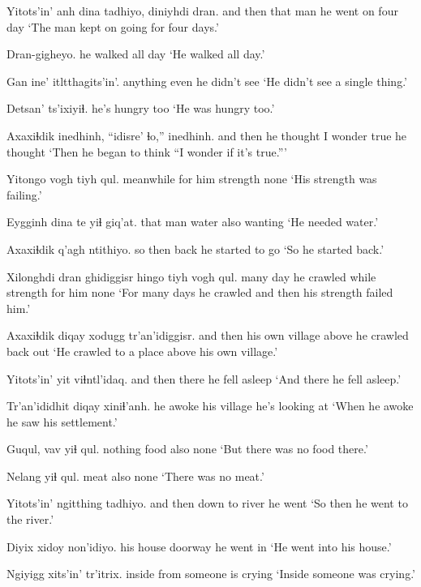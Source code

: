\documentclass[12pt]{article}
\begin{document}
\gll Yitots'in' anh dina tadhiyo, diniyhdi dran.
{and then} that man {he went on} four day
\glt `The man kept on going for four days.'
\glend

\gll Dran-gigheyo.
{{he walked all day}}
\glt `He walked all day.'
\glend

\gll Gan ine' itltthagits'in'.
anything even {he didn't see}
\glt `He didn't see a single thing.'
\glend

\gll Detsan' ts'ixiyiɬ.
{he's hungry} too
\glt `He was hungry too.'
\glend

\gll Axaxiɬdik inedhinh, ``idisre' ɬo,'' inedhinh.
{and then} {he thought} {I wonder} true {he thought}
\glt `Then he began to think ``I wonder if it's true.'''
\glend

\gll Yitongo vogh tiyh qul.
meanwhile {for him} strength none
\glt `His strength was failing.'
\glend

\gll Eygginh dina te yiɬ giq'at.
that  man water also wanting
\glt `He needed water.'
\glend

\gll Axaxiɬdik q'agh ntithiyo.
{so then}  back {he started to go}
\glt `So he started back.'
\glend

\gll Xilonghdi dran ghidiggisr hingo tiyh vogh qul.
many day  {he crawled} while strength {for him} none
\glt `For many days he crawled and then his strength failed him.'
\glend

\gll Axaxiɬdik diqay   xodugg tr'an'idiggisr.
{and then} {his own village} above  {he crawled back out}
\glt `He crawled to a place above his own village.'
\glend

\gll Yitots'in' yit viɬntl'idaq.
{and then} there {he fell asleep}
\glt `And there he fell asleep.'
\glend

\gll Tr'an'ididhit diqay  xiniɬ'anh.
{he awoke} {his village} {he's looking at}
\glt `When he awoke he saw his settlement.'
\glend

\gll Guqul, vav yiɬ qul.
nothing food also none
\glt `But there was no food there.'
\glend

\gll Nelang yiɬ qul.
meat  also none
\glt `There was no meat.'
\glend

\gll Yitots'in' ngitthing tadhiyo.
{and then} {down to river} {he went}
\glt `So then he went to the river.'
\glend

\gll Diyix  xidoy non'idiyo.
{his house} doorway {he went in}
\glt `He went into his house.'
\glend

\gll Ngiyigg xits'in' tr'itrix.
inside  from  {someone is crying}
\glt `Inside someone was crying.'
\glend
\end{document}
